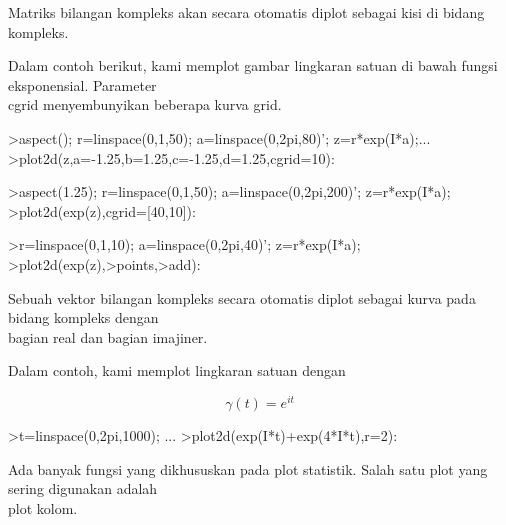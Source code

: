 \documentclass[a4paper,10pt]{article}
\begin{document}
\begin{eulernotebook}
\begin{eulercomment}
\begin{eulercomment}
\begin{eulercomment}
\begin{eulercomment}
\begin{eulercomment}
\begin{eulercomment}
\begin{eulercomment}
Matriks bilangan kompleks akan secara otomatis diplot sebagai kisi di
bidang kompleks.

Dalam contoh berikut, kami memplot gambar lingkaran satuan di bawah
fungsi eksponensial. Parameter\\
cgrid menyembunyikan beberapa kurva grid.
\end{eulercomment}
\begin{eulerprompt}
>aspect(); r=linspace(0,1,50); a=linspace(0,2pi,80)'; z=r*exp(I*a);...
>plot2d(z,a=-1.25,b=1.25,c=-1.25,d=1.25,cgrid=10):
\end{eulerprompt}
\begin{eulerprompt}
>aspect(1.25); r=linspace(0,1,50); a=linspace(0,2pi,200)'; z=r*exp(I*a);
>plot2d(exp(z),cgrid=[40,10]):
\end{eulerprompt}
\begin{eulerprompt}
>r=linspace(0,1,10); a=linspace(0,2pi,40)'; z=r*exp(I*a);
>plot2d(exp(z),>points,>add):
\end{eulerprompt}
\begin{eulercomment}
Sebuah vektor bilangan kompleks secara otomatis diplot sebagai kurva
pada bidang kompleks dengan\\
bagian real dan bagian imajiner.

Dalam contoh, kami memplot lingkaran satuan dengan

\end{eulercomment}
\begin{eulerformula}
\[
\gamma(t) = e^{it}
\]
\end{eulerformula}
\begin{eulerprompt}
>t=linspace(0,2pi,1000); ...
>plot2d(exp(I*t)+exp(4*I*t),r=2):
\end{eulerprompt}
\begin{eulercomment}
Ada banyak fungsi yang dikhususkan pada plot statistik. Salah satu
plot yang sering digunakan adalah\\
plot kolom.


\end{eulercomment}
\end{eulercomment}
\end{eulercomment}
\end{eulercomment}
\end{eulercomment}
\end{eulercomment}
\end{eulercomment}
\end{eulernotebook}
\end{document}
